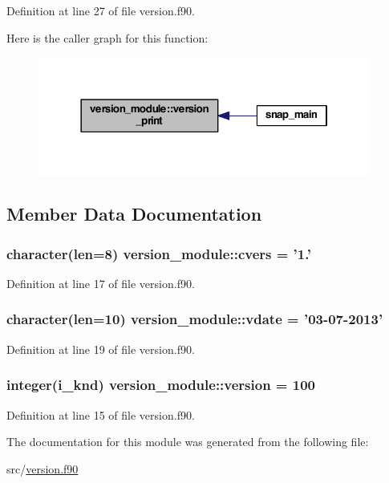 Definition at line 27 of file version.\-f90.



Here is the caller graph for this function\-:\nopagebreak
\begin{figure}[H]
\begin{center}
\leavevmode
\includegraphics[width=310pt]{classversion__module_a5ed83115741d1afa2856fffc7331a719_icgraph}
\end{center}
\end{figure}




\subsection{Member Data Documentation}
\hypertarget{classversion__module_ad22248c813ff49d5562410a5707d4424}{
\subsubsection[{cvers}]{\setlength{\rightskip}{0pt plus 5cm}character(len=8) version\-\_\-module\-::cvers = '1.'}}\label{classversion__module_ad22248c813ff49d5562410a5707d4424}


Definition at line 17 of file version.\-f90.

\hypertarget{classversion__module_a8ee99e648cd45a2dc8bf148b8e97b32d}{
\subsubsection[{vdate}]{\setlength{\rightskip}{0pt plus 5cm}character(len=10) version\-\_\-module\-::vdate = '03-\/07-\/2013'}}\label{classversion__module_a8ee99e648cd45a2dc8bf148b8e97b32d}


Definition at line 19 of file version.\-f90.

\hypertarget{classversion__module_a55cb5650d5ff58946595f412094ea9ed}{
\subsubsection[{version}]{\setlength{\rightskip}{0pt plus 5cm}integer(i\-\_\-knd) version\-\_\-module\-::version = 100}}\label{classversion__module_a55cb5650d5ff58946595f412094ea9ed}


Definition at line 15 of file version.\-f90.



The documentation for this module was generated from the following file\-:\begin{DoxyCompactItemize}
\item 
src/\hyperlink{version_8f90}{version.\-f90}\end{DoxyCompactItemize}
